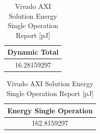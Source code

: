 \begin{table}[H]
	\centering
	\begin{minipage}[t]{0.45\linewidth}
		\centering
		\begin{tabular}{|c|}
			\hline
			\textbf{Dynamic Total} \\
			\hline
			16.28159297 \\
			\hline
		\end{tabular}
		\caption{Vivado AXI Solution Dynamic Power Report [mW]}
		\label{tab:vivado-axi-solution-total-dynamic-power-report}
	\end{minipage}
	\hfill
	\centering
	\begin{minipage}[t]{0.45\linewidth}
		\centering
		\begin{tabular}{|c|}
			\hline
			\textbf{Energy Single Operation} \\
			\hline
			162.8159297 \\
			\hline
		\end{tabular}
		\caption{Vivado AXI Solution Energy Single Operation Report [pJ]}
		\label{tab:vivado-axi-solution-energy-single-operation-report}
	\end{minipage}
\end{table}